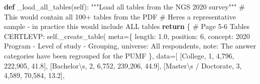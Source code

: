 \documentclass[
  11pt,
  a4paper,
]{article}
\newenvironment{Shaded}{\begin{snugshade}}{\end{snugshade}}
\newcommand{\CharTok}[1]{\textcolor[rgb]{0.13,0.47,0.30}{#1}}
\newcommand{\CommentTok}[1]{\textcolor[rgb]{0.37,0.37,0.37}{#1}}
\newcommand{\ControlFlowTok}[1]{\textcolor[rgb]{0.00,0.23,0.31}{\textbf{#1}}}
\newcommand{\KeywordTok}[1]{\textcolor[rgb]{0.00,0.23,0.31}{\textbf{#1}}}
\newcommand{\NormalTok}[1]{\textcolor[rgb]{0.00,0.23,0.31}{#1}}
\newcommand{\OperatorTok}[1]{\textcolor[rgb]{0.37,0.37,0.37}{#1}}
\newcommand{\StringTok}[1]{\textcolor[rgb]{0.13,0.47,0.30}{#1}}
\newcommand{\VariableTok}[1]{\textcolor[rgb]{0.07,0.07,0.07}{#1}}
\begin{document}
\begin{Shaded}
\begin{Highlighting}[]
    \KeywordTok{def}\NormalTok{ \_load\_all\_tables(}\VariableTok{self}\NormalTok{):}
        \CommentTok{"""Load all tables from the NGS 2020 survey"""}
        \CommentTok{\# This would contain all 100+ tables from the PDF}
        \CommentTok{\# Here\textquotesingle{}s a representative sample {-} in practice this would include ALL tables}
        \ControlFlowTok{return}\NormalTok{ \{}
            \CommentTok{\# Page 5{-}6 Tables}
            \StringTok{\textquotesingle{}CERTLEVP\textquotesingle{}}\NormalTok{: }\VariableTok{self}\NormalTok{.\_create\_table(}
\NormalTok{                meta}\OperatorTok{=}\NormalTok{\{}
                    \StringTok{\textquotesingle{}length\textquotesingle{}}\NormalTok{: }\StringTok{\textquotesingle{}1.0\textquotesingle{}}\NormalTok{, }\StringTok{\textquotesingle{}position\textquotesingle{}}\NormalTok{: }\StringTok{\textquotesingle{}6\textquotesingle{}}\NormalTok{,}
                    \StringTok{\textquotesingle{}concept\textquotesingle{}}\NormalTok{: }\StringTok{\textquotesingle{}2020 Program {-} Level of study {-} Grouping\textquotesingle{}}\NormalTok{,}
                    \StringTok{\textquotesingle{}universe\textquotesingle{}}\NormalTok{: }\StringTok{\textquotesingle{}All respondents\textquotesingle{}}\NormalTok{,}
                    \StringTok{\textquotesingle{}note\textquotesingle{}}\NormalTok{: }\StringTok{\textquotesingle{}The answer categories have been regrouped for the PUMF\textquotesingle{}}
\NormalTok{                \},}
\NormalTok{                data}\OperatorTok{=}\NormalTok{[}
\NormalTok{                    [}\StringTok{\textquotesingle{}College\textquotesingle{}}\NormalTok{, }\StringTok{\textquotesingle{}1\textquotesingle{}}\NormalTok{, }\StringTok{\textquotesingle{}4,796\textquotesingle{}}\NormalTok{, }\StringTok{\textquotesingle{}222,905\textquotesingle{}}\NormalTok{, }\StringTok{\textquotesingle{}41.8\textquotesingle{}}\NormalTok{],}
\NormalTok{                    [}\StringTok{\textquotesingle{}Bachelor}\CharTok{\textbackslash{}\textquotesingle{}}\StringTok{s\textquotesingle{}}\NormalTok{, }\StringTok{\textquotesingle{}2\textquotesingle{}}\NormalTok{, }\StringTok{\textquotesingle{}6,752\textquotesingle{}}\NormalTok{, }\StringTok{\textquotesingle{}239,206\textquotesingle{}}\NormalTok{, }\StringTok{\textquotesingle{}44.9\textquotesingle{}}\NormalTok{],}
\NormalTok{                    [}\StringTok{\textquotesingle{}Master}\CharTok{\textbackslash{}\textquotesingle{}}\StringTok{s / Doctorate\textquotesingle{}}\NormalTok{, }\StringTok{\textquotesingle{}3\textquotesingle{}}\NormalTok{, }\StringTok{\textquotesingle{}4,589\textquotesingle{}}\NormalTok{, }\StringTok{\textquotesingle{}70,584\textquotesingle{}}\NormalTok{, }\StringTok{\textquotesingle{}13.2\textquotesingle{}}\NormalTok{],}

\end{Highlighting}
\end{Shaded}
\end{document}
